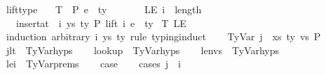 \begin{isabellebody}
\begin{isamarkuptext}
\end{isamarkuptext}\isamarkuptrue%
\isamarkupfalse%
\ lift{\isacharunderscore}{\kern0pt}type{\isacharcolon}{\kern0pt}\isanewline
\ \ \ T{\isacharcolon}{\kern0pt}\ {\isachardoublequoteopen}{\isasymGamma}\ {\isasymturnstile}{\isacharbraceleft}{\kern0pt}P{\isacharbraceright}{\kern0pt}\ e\ {\isacharcolon}{\kern0pt}\ ty{\isachardoublequoteclose}\isanewline
\ \ \ \ \ \ \ LE{\isacharcolon}{\kern0pt}\ {\isachardoublequoteopen}i\ {\isasymle}\ length\ {\isasymGamma}{\isachardoublequoteclose}\isanewline
\ \ \ {\isachardoublequoteopen}insert{\isacharunderscore}{\kern0pt}at\ {\isasymGamma}\ i\ {\isacharparenleft}{\kern0pt}ys{\isacharcomma}{\kern0pt}\ ty{}{\isacharparenright}{\kern0pt}\ {\isasymturnstile}{\isacharbraceleft}{\kern0pt}P{\isacharbraceright}{\kern0pt}\ {\isacharparenleft}{\kern0pt}lift\ i\ e{\isacharparenright}{\kern0pt}\ {\isacharcolon}{\kern0pt}\ ty{\isachardoublequoteclose}\isanewline
%
\isadelimproof
%
\endisadelimproof
%
\isatagproof
{}\isamarkupfalse%
\ T\ LE\isanewline
{}\isamarkupfalse%
\ {\isacharparenleft}{\kern0pt}induction\ arbitrary{\isacharcolon}{\kern0pt}\ i\ ys\ ty{}\ rule{\isacharcolon}{\kern0pt}\ typing{\isachardot}{\kern0pt}induct{\isacharparenright}{\kern0pt}\isanewline
\ \ \isamarkupfalse%
\ {\isacharparenleft}{\kern0pt}TyVar\ j\ {\isasymGamma}\ xs\ ty\ vs\ P{\isacharparenright}{\kern0pt}\isanewline
\ \ \isamarkupfalse%
\ j{\isacharunderscore}{\kern0pt}lt\ {\isacharequal}{\kern0pt}\ TyVar{\isachardot}{\kern0pt}hyps{\isacharparenleft}{\kern0pt}{}{\isacharparenright}{\kern0pt}\isanewline
\ \ \isamarkupfalse%
\ lookup\ {\isacharequal}{\kern0pt}\ TyVar{\isachardot}{\kern0pt}hyps{\isacharparenleft}{\kern0pt}{}{\isacharparenright}{\kern0pt}\isanewline
\ \ \isamarkupfalse%
\ len{\isacharunderscore}{\kern0pt}vs\ {\isacharequal}{\kern0pt}\ TyVar{\isachardot}{\kern0pt}hyps{\isacharparenleft}{\kern0pt}{}{\isacharparenright}{\kern0pt}\isanewline
\ \ \isamarkupfalse%
\ le{\isacharunderscore}{\kern0pt}i\ {\isacharequal}{\kern0pt}\ TyVar{\isachardot}{\kern0pt}prems\isanewline
\isanewline
\ \ \isamarkupfalse%
\ {\isacharquery}{\kern0pt}case\isanewline
\ \ \isamarkupfalse%
\ {\isacharparenleft}{\kern0pt}cases\ {\isachardoublequoteopen}j\ {\isacharless}{\kern0pt}\ i{\isachardoublequoteclose}{\isacharparenright}{\kern0pt}\isanewline

\end{isabellebody}
